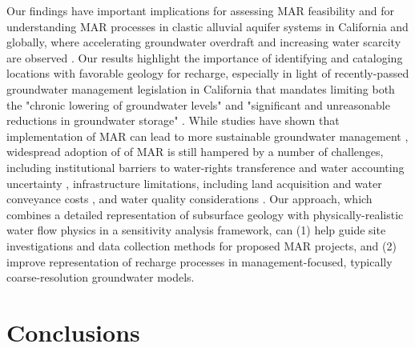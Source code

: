Our findings have important implications for assessing MAR feasibility and for understanding MAR processes in clastic alluvial aquifer systems in California and globally, where accelerating groundwater overdraft and increasing water scarcity are observed \citep{scanlon2012groundwater, famiglietti2011satellites, wada2011modelling}. Our results highlight the importance of identifying and cataloging locations with favorable geology for recharge, especially in light of recently-passed groundwater management legislation in California that mandates limiting both the "chronic lowering of groundwater levels" and "significant and unreasonable reductions in groundwater storage" \citep{kiparsky2016designing}. While studies have shown that implementation of MAR can lead to more sustainable groundwater management \citep[e.g.,][]{niswonger2017managed}, widespread adoption of of MAR is still hampered by a number of challenges, including institutional barriers to water-rights transference and water accounting uncertainty \citep{asano2016artificial}, infrastructure limitations, including land acquisition and water conveyance costs \citep{gailey2018approaches}, and water quality considerations \citep{hartog2017water}. Our approach, which combines a detailed representation of subsurface geology with physically-realistic water flow physics in a sensitivity analysis framework, can (1) help guide site investigations and data collection methods for proposed MAR projects, and (2) improve representation of recharge processes in management-focused, typically coarse-resolution groundwater models. 

\section{Conclusions} \label{Conclusions}

